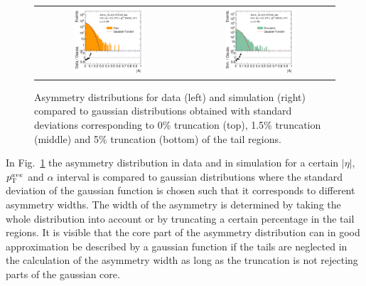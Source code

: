 \begin{figure}[!tp]
\begin{tabular}{cc}
                \includegraphics[width=0.49\textwidth]{figures/AsymmHistosDataWithRatio_Eta0_pt5_alpha2_final_nominal_95Truncation_v4.pdf} &
                \includegraphics[width=0.49\textwidth]{figures/AsymmHistosSimWithRatio_Eta0_pt5_alpha2_final_nominal_95Truncation_v4.pdf} \\
  \end{tabular}
  \caption{Asymmetry distributions for data (left) and simulation (right) compared to gaussian distributions obtained with standard deviations corresponding to 0\% truncation (top), 1.5\% truncation (middle) and 5\% truncation (bottom) of the tail regions.}
  \label{fig:asymm_width}
\end{figure}
In Fig.~\ref{fig:asymm_width} the asymmetry distribution in data and in simulation for a certain $|\eta|$, $p_{\text{T}}^{ave}$ and $\alpha$ interval is compared to gaussian distributions where the standard deviation of the gaussian function is chosen such that it corresponds to different asymmetry widths. The width of the asymmetry is determined by taking the whole distribution into account or by truncating a certain percentage in the tail regions. It is visible that the core part of the asymmetry distribution can in good approximation be described by a gaussian function if the tails are neglected in the calculation of the asymmetry width as long as the truncation is not rejecting parts of the gaussian core.\\
